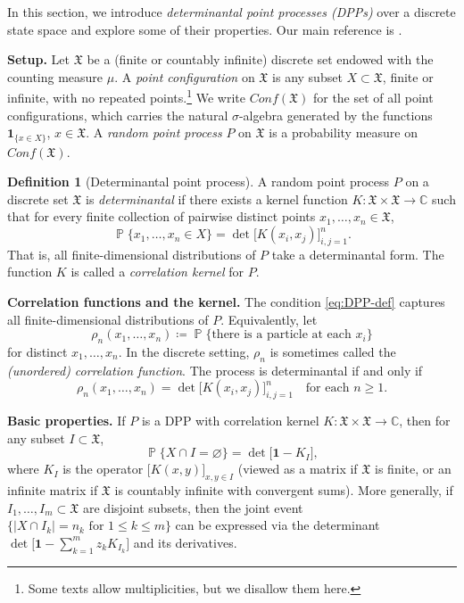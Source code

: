 \documentclass[letterpaper,11pt,oneside,reqno]{article}
\numberwithin{equation}{section}
\theoremstyle{definition}
\newtheorem{definition}[proposition]{Definition}
\begin{document}
In this section, we introduce \emph{determinantal point processes (DPPs)}
over a discrete state space and explore some of their properties.
Our main reference is \cite{Borodin2009}.

\medskip

\noindent\textbf{Setup.} Let \(\mathfrak{X}\) be a (finite or countably infinite)
discrete set endowed with the counting measure \(\mu\).
A \emph{point configuration} on \(\mathfrak{X}\) is any subset \(X\subset \mathfrak{X}\),
finite or infinite, with no repeated points.\footnote{Some texts allow
multiplicities, but we disallow them here.}
We write \(Conf(\mathfrak{X})\) for the set of all point configurations,
which carries the natural \(\sigma\)-algebra generated by the functions
\(\mathbf{1}_{\{x\in X\}}\), \(x\in\mathfrak{X}\). A \emph{random point process} \(P\)
on \(\mathfrak{X}\) is a probability measure on \(Conf(\mathfrak{X})\).

\begin{definition}[Determinantal point process]
\label{def:dpp-discrete}
A random point process \(P\) on a discrete set \(\mathfrak{X}\) is \emph{determinantal}
if there exists a kernel function \(K:\mathfrak{X}\times\mathfrak{X} \to \mathbb{C}\) such that
for every finite collection of pairwise distinct points \(x_1,\dots,x_n\in \mathfrak{X}\),
\begin{equation}
\label{eq:DPP-def}
\operatorname{\mathbb{P}}\{x_1,\dots,x_n\in X\} = \det\bigl[K(x_i,x_j)\bigr]_{i,j=1}^n.
\end{equation}
That is, all finite-dimensional distributions of \(P\) take a determinantal form.
The function \(K\) is called a \emph{correlation kernel} for \(P\).
\end{definition}

\noindent\textbf{Correlation functions and the kernel.}
The condition \eqref{eq:DPP-def} captures all finite-dimensional distributions of \(P\).
Equivalently, let
\[
	\rho_n(x_1,\dots,x_n) \coloneqq \operatorname{\mathbb{P}}\{\text{there is a particle at each }x_i\}
\]
for distinct \(x_1,\dots,x_n\). In the discrete setting, \(\rho_n\) is
sometimes called the \emph{(unordered) correlation function}. The process is
determinantal if and only if
\[
\rho_n(x_1,\dots,x_n) = \det\bigl[K(x_i,x_j)\bigr]_{i,j=1}^n
\quad
\text{for each }n\ge1.
\]

\noindent\textbf{Basic properties.} If \(P\) is a DPP with correlation kernel
\(K\colon \mathfrak{X}\times\mathfrak{X}\to\mathbb{C}\), then for any subset \(I\subset \mathfrak{X}\),
\begin{equation}
\label{eq:prob-empty-set-DPP}
\operatorname{\mathbb{P}}\{X\cap I = \varnothing\} = \det\bigl[\mathbf{1} - K_I\bigr],
\end{equation}
where \(K_I\) is the operator \(\bigl[K(x,y)\bigr]_{x,y\in I}\)
(viewed as a matrix if \(\mathfrak{X}\) is finite, or an infinite matrix if \(\mathfrak{X}\) is
countably infinite with convergent sums). More generally, if \(I_1,\dots,I_m\subset \mathfrak{X}\)
are disjoint subsets, then the joint event \(\{|X\cap I_k|=n_k\text{ for }1\le k\le m\}\)
can be expressed via the determinant
\(\det\bigl[\mathbf{1}-\sum_{k=1}^m z_k K_{I_k}\bigr]\)
and its derivatives.
\end{document}
